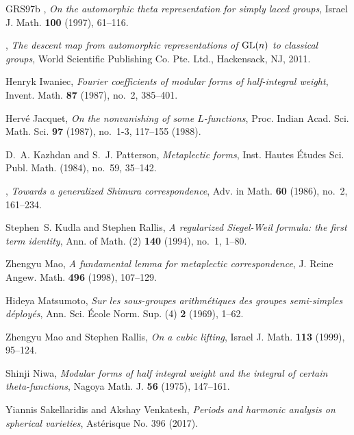 \documentclass[12pt]{amsart}
\theoremstyle{remark}
\begin{document}
\begin{thebibliography}{GRS97b}
\bysame, \emph{On the automorphic theta representation for simply laced
  groups}, Israel J. Math. \textbf{100} (1997), 61--116. 

\bysame, \emph{The descent map from automorphic representations of {${\rm
  GL}(n)$} to classical groups}, World Scientific Publishing Co. Pte. Ltd.,
  Hackensack, NJ, 2011. 

Henryk Iwaniec, \emph{Fourier coefficients of modular forms of half-integral
  weight}, Invent. Math. \textbf{87} (1987), no.~2, 385--401. 

Herv{\'e} Jacquet, \emph{On the nonvanishing of some {$L$}-functions}, Proc.
  Indian Acad. Sci. Math. Sci. \textbf{97} (1987), no.~1-3, 117--155 (1988).

D.~A. Kazhdan and S.~J. Patterson, \emph{Metaplectic forms}, Inst. Hautes
  \'Etudes Sci. Publ. Math. (1984), no.~59, 35--142. 

\bysame, \emph{Towards a generalized {S}himura correspondence}, Adv. in Math.
  \textbf{60} (1986), no.~2, 161--234. 

Stephen~S. Kudla and Stephen Rallis, \emph{A regularized {S}iegel-{W}eil
  formula: the first term identity}, Ann. of Math. (2) \textbf{140} (1994),
  no.~1, 1--80. 

Zhengyu Mao, \emph{A fundamental lemma for metaplectic correspondence}, J.
  Reine Angew. Math. \textbf{496} (1998), 107--129. 

Hideya Matsumoto, \emph{Sur les sous-groupes arithm\'{e}tiques des groupes
  semi-simples d\'{e}ploy\'{e}s}, Ann. Sci. \'{E}cole Norm. Sup. (4) \textbf{2}
  (1969), 1--62. 

Zhengyu Mao and Stephen Rallis, \emph{On a cubic lifting}, Israel J. Math.
  \textbf{113} (1999), 95--124. 

Shinji Niwa, \emph{Modular forms of half integral weight and the integral of
  certain theta-functions}, Nagoya Math. J. \textbf{56} (1975), 147--161.
  
  Yiannis Sakellaridis and Akshay Venkatesh, 
  \emph{Periods and harmonic analysis on spherical varieties}, 
  Ast\'erisque No. 396 (2017). 


\end{thebibliography}
\end{document}
